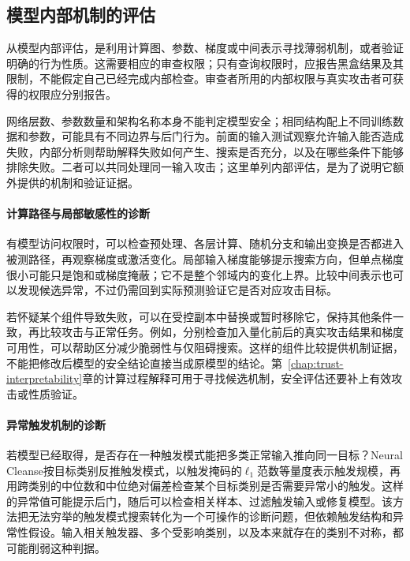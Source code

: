 \subsection{模型内部机制的评估}
\label{sec:security-model-test}

从模型内部评估，是利用计算图、参数、梯度或中间表示寻找薄弱机制，或者验证明确的行为性质。这需要相应的审查权限；只有查询权限时，应报告黑盒结果及其限制，不能假定自己已经完成内部检查。审查者所用的内部权限与真实攻击者可获得的权限应分别报告。

网络层数、参数数量和架构名称本身不能判定模型安全；相同结构配上不同训练数据和参数，可能具有不同边界与后门行为。前面的输入测试观察允许输入能否造成失败，内部分析则帮助解释失败如何产生、搜索是否充分，以及在哪些条件下能够排除失败。二者可以共同处理同一输入攻击；这里单列内部评估，是为了说明它额外提供的机制和验证证据。

\paragraph{计算路径与局部敏感性的诊断}

有模型访问权限时，可以检查预处理、各层计算、随机分支和输出变换是否都进入被测路径，再观察梯度或激活变化。局部输入梯度能够提示搜索方向，但单点梯度很小可能只是饱和或梯度掩蔽；它不是整个邻域内的变化上界。比较中间表示也可以发现候选异常，不过仍需回到实际预测验证它是否对应攻击目标。

若怀疑某个组件导致失败，可以在受控副本中替换或暂时移除它，保持其他条件一致，再比较攻击与正常任务。例如，分别检查加入量化前后的真实攻击结果和梯度可用性，可以帮助区分减少脆弱性与仅阻碍搜索。这样的组件比较提供机制证据，不能把修改后模型的安全结论直接当成原模型的结论。第~\ref{chap:trust-interpretability}章的计算过程解释可用于寻找候选机制，安全评估还要补上有效攻击或性质验证。

\paragraph{异常触发机制的诊断}

若模型已经取得，是否存在一种触发模式能把多类正常输入推向同一目标？Neural Cleanse按目标类别反推触发模式，以触发掩码的$\ell_1$范数等量度表示触发规模，再用跨类别的中位数和中位绝对偏差检查某个目标类别是否需要异常小的触发。这样的异常值可能提示后门，随后可以检查相关样本、过滤触发输入或修复模型。该方法把无法穷举的触发模式搜索转化为一个可操作的诊断问题，但依赖触发结构和异常性假设。输入相关触发器、多个受影响类别，以及本来就存在的类别不对称，都可能削弱这种判据。

